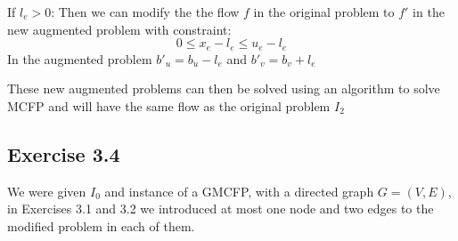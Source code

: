 If \(l_e>0\): Then we can modify the the flow \(f\) in the original problem to \(f'\) in the new augmented problem with constraint: \[ 0 \le x_e - l_e \le u_e - l_e\]
In the augmented problem \(b'_u = b_u - l_e\) and \(b'_v = b_v + l_e\)

These new augmented problems can then be solved using an algorithm to solve MCFP and will have the same flow as the original problem \(I_2\)


\subsection{Exercise 3.4}
We were given \(I_0\) and instance of a GMCFP, with a directed graph \(G =(V,E)\), in Exercises 3.1 and 3.2 we introduced at most one node and two edges to the modified problem in each of them.
